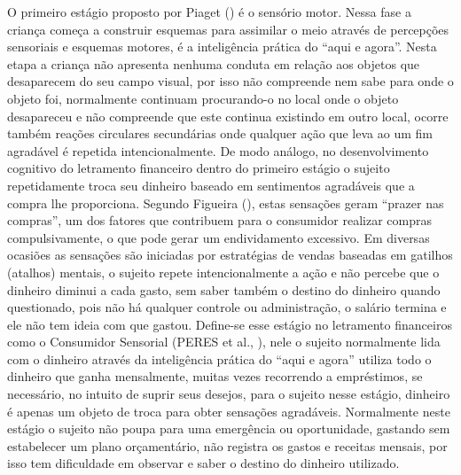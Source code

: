O primeiro estágio proposto por Piaget (\citeyear{piaget1971}) é o sensório motor. Nessa fase a criança começa a construir esquemas para assimilar o meio através de percepções sensoriais e esquemas motores, é a inteligência prática do “aqui e agora”. Nesta etapa a criança não apresenta nenhuma conduta em relação aos objetos que desaparecem do seu campo visual, por isso não compreende nem sabe para onde o objeto foi, normalmente continuam procurando-o no local onde o objeto desapareceu e não compreende que este continua existindo em outro local, ocorre também reações circulares secundárias onde qualquer ação que leva ao um fim agradável é repetida intencionalmente. De modo análogo, no desenvolvimento cognitivo do letramento financeiro dentro do primeiro estágio o sujeito repetidamente troca seu dinheiro baseado em sentimentos agradáveis que a compra lhe proporciona. Segundo Figueira (\citeyear{figueira2014}), estas sensações geram “prazer nas compras”, um dos fatores que contribuem para o consumidor realizar compras compulsivamente, o que pode gerar um endividamento excessivo. Em diversas ocasiões as sensações são iniciadas por estratégias de vendas baseadas em gatilhos (atalhos) mentais, o sujeito repete intencionalmente a ação e não percebe que o dinheiro diminui a cada gasto, sem saber também o destino do dinheiro quando questionado, pois não há qualquer controle ou administração, o salário termina e ele não tem ideia com que gastou. Define-se esse estágio no letramento financeiros como o Consumidor Sensorial (PERES et al., \citeyear{peres2019}), nele o sujeito normalmente lida com o dinheiro através da inteligência prática do “aqui e agora” utiliza todo o dinheiro que ganha mensalmente, muitas vezes recorrendo a empréstimos, se necessário, no intuito de suprir seus desejos, para o sujeito nesse estágio, dinheiro é apenas um objeto de troca para obter sensações agradáveis. Normalmente neste estágio o sujeito não poupa para uma emergência ou oportunidade, gastando sem estabelecer um plano orçamentário, não registra os gastos e receitas mensais, por isso tem dificuldade em observar e saber o destino do dinheiro utilizado.

